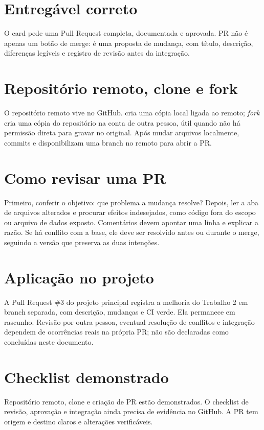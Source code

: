 \documentclass[11pt,a4paper]{article}
\begin{document}
\section*{Entregável correto}
O card pede uma Pull Request completa, documentada e aprovada. PR não é apenas um botão de merge: é uma proposta de mudança, com título, descrição, diferenças legíveis e registro de revisão antes da integração.
\section*{Repositório remoto, clone e fork}
O repositório remoto vive no GitHub.  cria uma cópia local ligada ao remoto; \textit{fork} cria uma cópia do repositório na conta de outra pessoa, útil quando não há permissão direta para gravar no original. Após mudar arquivos localmente, commits e  disponibilizam uma branch no remoto para abrir a PR.
\section*{Como revisar uma PR}
Primeiro, conferir o objetivo: que problema a mudança resolve? Depois, ler a aba de arquivos alterados e procurar efeitos indesejados, como código fora do escopo ou arquivo de dados exposto. Comentários devem apontar uma linha e explicar a razão. Se há conflito com a base, ele deve ser resolvido antes ou durante o merge, seguindo a versão que preserva as duas intenções.
\section*{Aplicação no projeto}
A Pull Request \#3 do projeto principal registra a melhoria do Trabalho 2 em branch separada, com descrição, mudanças e CI verde. Ela permanece em rascunho. Revisão por outra pessoa, eventual resolução de conflitos e integração dependem de ocorrências reais na própria PR; não são declaradas como concluídas neste documento.
\section*{Checklist demonstrado}
Repositório remoto, clone e criação de PR estão demonstrados. O checklist de revisão, aprovação e integração ainda precisa de evidência no GitHub. A PR tem origem e destino claros e alterações verificáveis.
\end{document}
